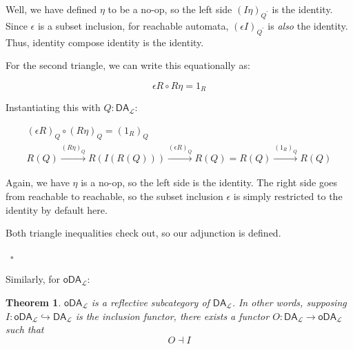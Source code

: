 \documentclass{article}
\theoremstyle{plain}
\newtheorem{theorem}{Theorem}
\theoremstyle{definition}
\begin{document}
Well, we have defined \ensuremath{\eta} to be a no-op, so the left side \ensuremath{{\left( I \eta \right)}_{{Q}^{'}}} is the identity. Since \ensuremath{\epsilon} is a subset inclusion, for reachable automata, \ensuremath{{\left( \epsilon I \right)}_{{Q}^{'}}} is \emph{also} the identity. Thus, identity compose identity is the identity.

For the second triangle, we can write this equationally as:

\[
\epsilon R \circ R \eta = {1}_{R}
\]

Instantiating this with \ensuremath{Q : {\mathsf{DA}}_{\mathcal{L}}}:

\[
\begin{aligned}
{\left( \epsilon R \right)}_{Q} \circ {\left( R \eta \right)}_{Q} = {\left( {1}_{R} \right)}_{Q} \\ R\left( Q \right) \xrightarrow{{\left( R \eta \right)}_{Q}} R\left( I\left( R\left( Q \right) \right) \right) \xrightarrow{{\left( \epsilon R \right)}_{Q}} R\left( Q \right) = R\left( Q \right) \xrightarrow{{\left( {1}_{R} \right)}_{Q}} R\left( Q \right)
\end{aligned}
\]

Again, we have \ensuremath{\eta} is a no-op, so the left side is the identity. The right side goes from reachable to reachable, so the subset inclusion \ensuremath{\epsilon} is simply restricted to the identity by default here.

Both triangle inequalities check out, so our adjunction is defined.



    







    

    ~\ensuremath{\square}

Similarly, for \ensuremath{{\mathsf{oDA}}_{\mathcal{L}}}:

\begin{theorem}
\ensuremath{{\mathsf{oDA}}_{\mathcal{L}}} is a reflective subcategory of \ensuremath{{\mathsf{DA}}_{\mathcal{L}}}. In other words, supposing \ensuremath{I : {\mathsf{oDA}}_{\mathcal{L}} \hookrightarrow {\mathsf{DA}}_{\mathcal{L}}} is the inclusion functor, there exists a functor \ensuremath{O : {\mathsf{DA}}_{\mathcal{L}} \rightarrow {\mathsf{oDA}}_{\mathcal{L}}} such that \[
O \dashv I
\]
\end{theorem}
\label{oDALReflectiveSubcategory} 
\end{document}
